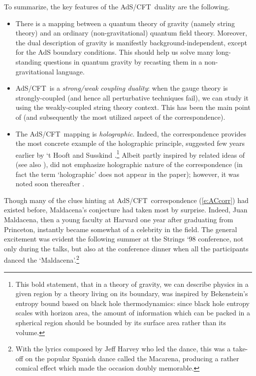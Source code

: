 \documentclass[12pt]{article}
\def\req#1{(\ref{#1})}
\def\AC{AdS/CFT}
\begin{document}
To summarize, the key features of the \AC\ duality are the following.
\begin{itemize}
\item 
There is a mapping between a quantum theory of gravity (namely string theory) and an ordinary (non-gravitational) quantum field theory.  Moreover, the dual description of gravity is manifestly background-independent, except for the AdS boundary conditions.
This should help us solve many long-standing questions in quantum gravity by recasting them in a non-gravitational language.
\item 
\AC\ is a {\it strong/weak coupling duality}: when the gauge theory is strongly-coupled (and hence all perturbative techniques fail), we can study it using the weakly-coupled string theory context.  This has been the main point of \cite{Maldacena:1997re} (and subsequently the most utilized aspect of the correspondence).
\item
The \AC\ mapping is {\it holographic}.  Indeed, the correspondence  provides the most concrete example of the holographic principle, suggested few years earlier by `t Hooft \cite{tHooft:1993gx} and Susskind \cite{Susskind:1994vu}.\footnote{
This bold statement, that in a theory of gravity, we can describe physics in a given region by a theory living on its boundary, was inspired by Bekenstein's entropy bound \cite{Bekenstein:1993dz} based on black hole thermodynamics: since black hole entropy scales with horizon area, the amount of information which can be packed in a spherical region should be bounded by its surface area rather than its volume.
}
Albeit partly inspired by related ideas of \cite{Polyakov:1997tj} (see also \cite{Polyakov:1998ju}),   \cite{Maldacena:1997re} did not emphasize holographic nature of the correspondence (in fact the term `holographic' does not appear in the paper); however, it was noted soon thereafter \cite{Witten:1998qj,Susskind:1998dq}.

\end{itemize}

Though many of the clues hinting at \AC\ correspondence \req{e:ACcorr} had existed before, Maldacena's conjecture \cite{Maldacena:1997re} had taken most by surprise.  Indeed, Juan Maldacena, then a young faculty at Harvard one year after graduating from Princeton, instantly became somewhat of a celebrity in the field. 
The general excitement was evident the following summer at the Strings `98 conference, not only during the talks, but also at the conference dinner when all the participants danced  the `Maldacena'.\footnote{
With the lyrics composed by Jeff Harvey who led the dance, this was a take-off on the popular Spanish dance called the Macarena, producing a rather comical effect which made the occasion doubly memorable.} 
\end{document}

